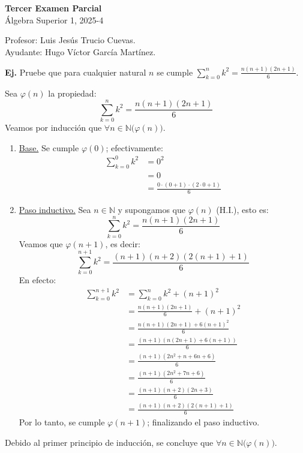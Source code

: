 \documentclass[letterpaper,DIV=18,headsepline,13pt]{scrartcl}
\makeatletter
\newcounter{Ejer}
\newcommand{\pts}{}
\newenvironment{ejercicio}[1]{\noindent
    \ifthenelse{\equal{#1}{1}}{\renewcommand{\pts}{\textbf{(#1 pt)}}}{\renewcommand{\pts}{\textbf{(#1 pts)}}}\textbf{Ej. \theEjer} \pts\stepcounter{Ejer}}{\vspace{.3cm}}
\renewenvironment{proof}[1][]{%
        \par\pushQED{\qed}%
        \normalfont\topsep6pt \partopsep0pt %
        \trivlist
        \item[\hskip\labelsep
                \textbf{\textit{Demostración.}}%
        ]#1
        }{%
        \popQED\endtrivlist\@endpefalse
    }
\makeatother
\begin{document}
    \begin{center}
        {\fontsize{30}{40}\rmfamily \textbf{Tercer Examen Parcial}} \\ \vspace{.2cm}
        Álgebra Superior 1, 2025-4
    \end{center}
    \begin{flushright}
        \footnotesize \hfill Profesor: Luis Jesús Trucio Cuevas.\\
        \hfill Ayudante: Hugo Víctor García Martínez.
    \end{flushright} 

    \begin{ejercicio}{4}
        Pruebe que para cualquier natural $n$ se cumple $\displaystyle \sum_{k=0}^{n} k^2 = \frac{n(n+1)(2n+1)}{6} $.
    \end{ejercicio}
    \begin{proof}
        Sea $\varphi(n)$ la propiedad:
        \[ \sum_{k=0}^{n} k^2 = \frac{n(n+1)(2n+1)}{6} \]
        Veamos por inducción que $\forall n \in \mathbb{N} \big( \varphi(n) \big)$.
        \begin{enumerate}[\hspace{1cm}]
            \item \underline{Base.} Se cumple $\varphi(0)$; efectivamente:
            \begin{align*}
                \sum_{k=0}^{0} k^2 &= 0^2 \\
                & = 0 \\
                & = \frac{0 \cdot (0+1) \cdot (2\cdot 0 + 1)}{6} 
            \end{align*}
            \item \underline{Paso inductivo.} Sea $n \in \mathbb{N}$ y supongamos que $\varphi(n)$ (H.I.), esto es:
            \[ \sum_{k=0}^{n} k^2 = \frac{n(n+1)(2n+1)}{6} \]
            Veamos que $\varphi(n+1)$, es decir:
            \[ \sum_{k=0}^{n+1} k^2 = \frac{(n+1)(n+2)(2(n+1)+1)}{6} \]
            En efecto:
            \begin{align*}
                \sum_{k=0}^{n+1} k^2 &= \sum_{k=0}^{n} k^2 + (n+1)^2 \\
                &= \frac{n(n+1)(2n+1)}{6} + (n+1)^2 \tag{por H.I.} \\
                &= \frac{n(n+1)(2n+1) + 6(n+1)^2}{6} \\
                &= \frac{(n+1)(n(2n+1) + 6(n+1))}{6} \\
                &= \frac{(n+1)(2n^2 + n + 6n + 6)}{6} \\
                &= \frac{(n+1)(2n^2 + 7n + 6)}{6} \\
                &= \frac{(n+1)(n+2)(2n+3)}{6} \\
                &= \frac{(n+1)(n+2)(2(n+1)+1)}{6}
            \end{align*}
            Por lo tanto, se cumple $\varphi(n+1)$; finalizando el paso inductivo.
        \end{enumerate}
        Debido al primer principio de inducción, se concluye que $\forall n \in \mathbb{N} \big( \varphi(n) \big)$.
    \end{proof}
\end{document}
